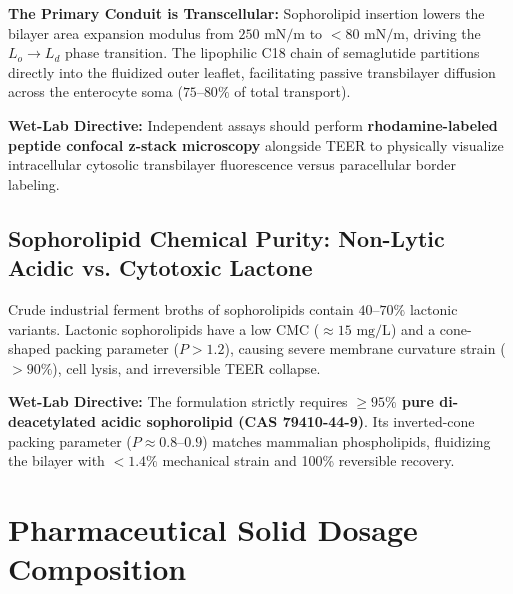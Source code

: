 \documentclass[10pt,twocolumn,letterpaper]{article}
\begin{document}
\textbf{The Primary Conduit is Transcellular:} Sophorolipid insertion lowers the bilayer area expansion modulus from $250\text{ mN/m}$ to $<80\text{ mN/m}$, driving the $L_o \rightarrow L_d$ phase transition. The lipophilic C18 chain of semaglutide partitions directly into the fluidized outer leaflet, facilitating passive transbilayer diffusion across the enterocyte soma ($75\text{--}80\%$ of total transport).

\textbf{Wet-Lab Directive:} Independent assays should perform \textbf{rhodamine-labeled peptide confocal z-stack microscopy} alongside TEER to physically visualize intracellular cytosolic transbilayer fluorescence versus paracellular border labeling.

\subsection{Sophorolipid Chemical Purity: Non-Lytic Acidic vs. Cytotoxic Lactone}
Crude industrial ferment broths of sophorolipids contain $40\text{--}70\%$ lactonic variants. Lactonic sophorolipids have a low CMC ($\approx 15\text{ mg/L}$) and a cone-shaped packing parameter ($P > 1.2$), causing severe membrane curvature strain ($>90\%$), cell lysis, and irreversible TEER collapse.

\textbf{Wet-Lab Directive:} The formulation strictly requires \textbf{$\ge 95\%$ pure di-deacetylated acidic sophorolipid (CAS 79410-44-9)}. Its inverted-cone packing parameter ($P \approx 0.8\text{--}0.9$) matches mammalian phospholipids, fluidizing the bilayer with $<1.4\%$ mechanical strain and 100\% reversible recovery.

\section{Pharmaceutical Solid Dosage Composition}
\end{document}
